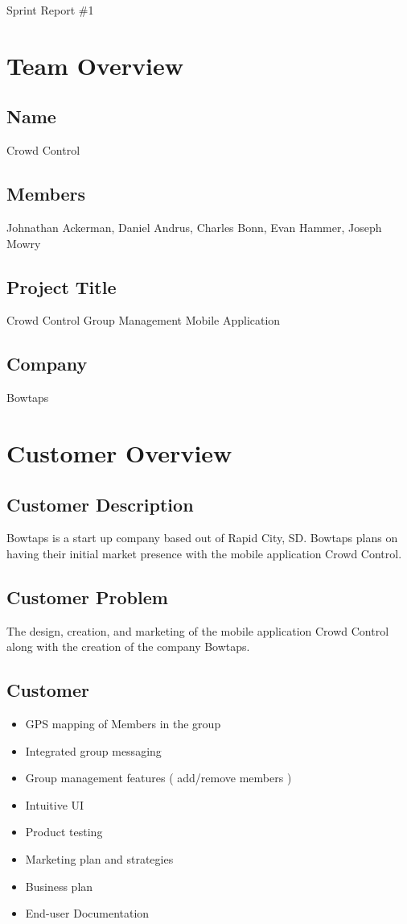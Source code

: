 \documentclass[11pt]{article}
\begin{document}
{\fontsize{16}{16}\selectfont Sprint Report \#1}

\section*{Team Overview}

\subsection*{Name}
Crowd Control
\subsection*{Members}
Johnathan Ackerman, Daniel Andrus, Charles Bonn, Evan Hammer, Joseph Mowry
\subsection*{Project Title}
Crowd Control Group Management Mobile Application
\subsection*{Company}
Bowtaps

\section*{Customer Overview}

\subsection*{Customer Description}
Bowtaps is a start up company based out of Rapid City, SD. Bowtaps plans on having their initial market presence with the mobile application Crowd Control.

\subsection*{Customer Problem}
The design, creation, and marketing of the mobile application Crowd Control along with the creation of the company Bowtaps.

\subsection*{Customer}

	\begin{itemize}
		\item GPS mapping of Members in the group
		\item Integrated group messaging
		\item Group management features ( add/remove members )
		\item Intuitive UI
		\item Product testing
		\item Marketing plan and strategies
		\item Business plan
		\item End-user Documentation
	\end{itemize}
\end{document}

